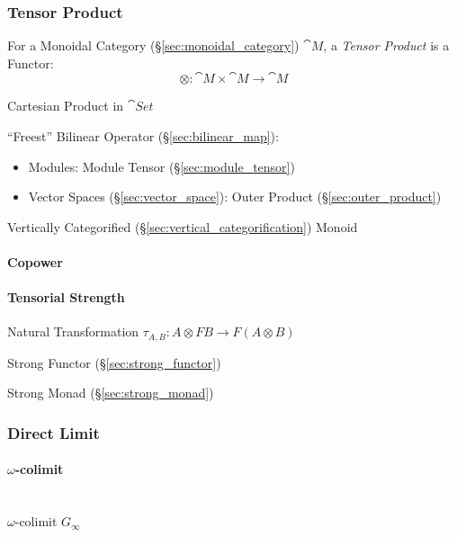 \subsubsection{Tensor Product}\label{sec:tensor_product}

For a Monoidal Category (\S\ref{sec:monoidal_category}) $\cat{M}$,
a \emph{Tensor Product} is a Functor:
\[
  \otimes : \cat{M} \times \cat{M} \rightarrow \cat{M}
\]

Cartesian Product in $\cat{Set}$

``Freest'' Bilinear Operator (\S\ref{sec:bilinear_map}):
\begin{itemize}
\item Modules: Module Tensor (\S\ref{sec:module_tensor})
\item Vector Spaces (\S\ref{sec:vector_space}): Outer Product
  (\S\ref{sec:outer_product})
\end{itemize}

Vertically Categorified (\S\ref{sec:vertical_categorification}) Monoid



\paragraph{Copower}\label{sec:copower}

\paragraph{Tensorial Strength}\label{sec:tensorial_strength}

Natural Transformation $\tau_{A,B} : A \otimes F B \rightarrow F (A
\otimes B)$

Strong Functor (\S\ref{sec:strong_functor})

Strong Monad (\S\ref{sec:strong_monad})



\subsubsection{Direct Limit}\label{sec:direct_limit}

\paragraph{$\omega$-colimit}\label{sec:omega_colimit}
\hfill \\

$\omega$-colimit $G_\infty$

